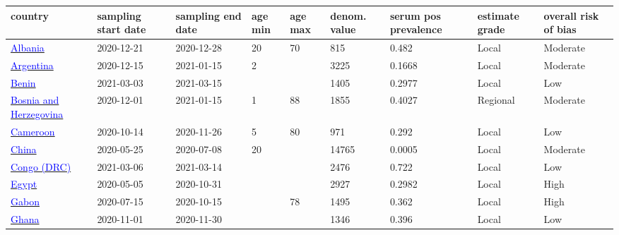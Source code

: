 \begin{table}[ht]  
    \footnotesize
    \begin{center}
        \begin{tabular}{p{2cm} | p{1.6cm} | p{1.6cm} | p{0.8cm} | p{0.8cm} | p{1cm} | p{1.3cm} | p{1.2cm} | p{1.2cm}}
            \hline

            \textbf{country} & \textbf{sampling start date} & \textbf{sampling end date} & \textbf{age min} & \textbf{age max} & \textbf{denom. value} & \textbf{serum pos prevalence} & \textbf{estimate grade} & \textbf{overall risk of bias} \\ 
\hline 
\href{https://doi.org/10.1101/2021.02.18.21251776}{\textcolor{blue}{Albania}} & 2020-12-21 & 2020-12-28 & 20 & 70 & 815 & 0.482 & Local & Moderate \\ 
\hline 
\href{https://dx.doi.org/10.1590/0102-311XES219821}{\textcolor{blue}{Argentina}} & 2020-12-15 & 2021-01-15 & 2 &  & 3225 & 0.1668 & Local & Moderate \\ 
\hline 
\href{https://dx.doi.org/10.1101/2022.04.26.22274330}{\textcolor{blue}{Benin}} & 2021-03-03 & 2021-03-15 &  &  & 1405 & 0.2977 & Local & Low \\ 
\hline 
\href{https://dx.doi.org/10.1371/journal.pone.0262738}{\textcolor{blue}{Bosnia and Herzegovina}} & 2020-12-01 & 2021-01-15 & 1 & 88 & 1855 & 0.4027 & Regional & Moderate \\ 
\hline 
\href{https://dx.doi.org/10.1038/s41467-021-25946-0}{\textcolor{blue}{Cameroon}} & 2020-10-14 & 2020-11-26 & 5 & 80 & 971 & 0.292 & Local & Low \\ 
\hline 
\href{https://dx.doi.org/10.1016/j.lanwpc.2020.100041}{\textcolor{blue}{China}} & 2020-05-25 & 2020-07-08 & 20 &  & 14765 & 0.0005 & Local & Moderate \\ 
\hline 
\href{https://dx.doi.org/10.3201/eid2901.221009}{\textcolor{blue}{Congo (DRC)}} & 2021-03-06 & 2021-03-14 &  &  & 2476 & 0.722 & Local & Low \\ 
\hline 
\href{http://dx.doi.org/10.1371/journal.pone.0254581}{\textcolor{blue}{Egypt}} & 2020-05-05 & 2020-10-31 &  &  & 2927 & 0.2982 & Local & High \\ 
\hline 
\href{https://dx.doi.org/10.1186/s13104-021-05570-3}{\textcolor{blue}{Gabon}} & 2020-07-15 & 2020-10-15 &  & 78 & 1495 & 0.362 & Local & High \\ 
\hline 
\href{https://dx.doi.org/10.1038/s41598-022-25598-0}{\textcolor{blue}{Ghana}} & 2020-11-01 & 2020-11-30 &  &  & 1346 & 0.396 & Local & Low \\ 

\end{tabular}
\end{center}
\end{table}

